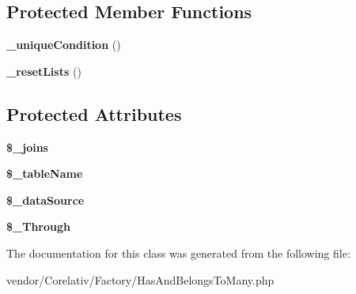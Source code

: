 \subsection*{Protected Member Functions}
\begin{DoxyCompactItemize}
\item 
\hypertarget{classHasAndBelongsToMany_aa01081764eb19ced094594f035502b40}{
{\bfseries \_\-uniqueCondition} ()}
\label{classHasAndBelongsToMany_aa01081764eb19ced094594f035502b40}

\item 
\hypertarget{classHasAndBelongsToMany_a1d29ca6a2aafffa4945d14e0865591f6}{
{\bfseries \_\-resetLists} ()}
\label{classHasAndBelongsToMany_a1d29ca6a2aafffa4945d14e0865591f6}

\end{DoxyCompactItemize}
\subsection*{Protected Attributes}
\begin{DoxyCompactItemize}
\item 
\hypertarget{classHasAndBelongsToMany_a66945a072b87c099dbe17710b916703e}{
{\bfseries \$\_\-joins}}
\label{classHasAndBelongsToMany_a66945a072b87c099dbe17710b916703e}

\item 
\hypertarget{classHasAndBelongsToMany_a2a76fdf3e8e0af25c251157f55822d30}{
{\bfseries \$\_\-tableName}}
\label{classHasAndBelongsToMany_a2a76fdf3e8e0af25c251157f55822d30}

\item 
\hypertarget{classHasAndBelongsToMany_a05ba830b04655d13d405922bba37be28}{
{\bfseries \$\_\-dataSource}}
\label{classHasAndBelongsToMany_a05ba830b04655d13d405922bba37be28}

\item 
\hypertarget{classHasAndBelongsToMany_a5cd3298ffaf6fdd17a4be30acf243d81}{
{\bfseries \$\_\-Through}}
\label{classHasAndBelongsToMany_a5cd3298ffaf6fdd17a4be30acf243d81}

\end{DoxyCompactItemize}


The documentation for this class was generated from the following file:\begin{DoxyCompactItemize}
\item 
vendor/Corelativ/Factory/HasAndBelongsToMany.php\end{DoxyCompactItemize}
